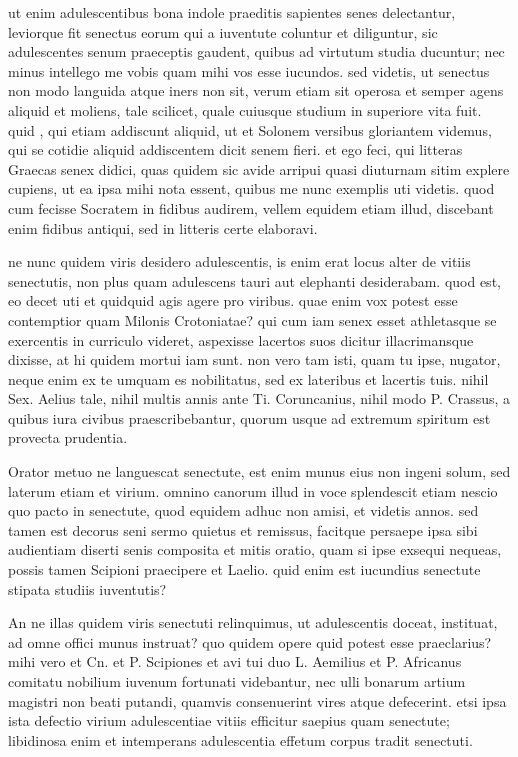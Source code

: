  ut enim adulescentibus bona indole praeditis sapientes senes delectantur, leviorque fit senectus eorum qui a iuventute coluntur et diliguntur, sic adulescentes senum praeceptis gaudent, quibus ad virtutum studia ducuntur; nec minus intellego me vobis quam mihi vos esse iucundos. sed videtis, ut senectus non modo languida atque iners non sit, verum etiam sit operosa et semper agens aliquid et moliens, tale scilicet, quale cuiusque studium in superiore vita fuit. quid , qui etiam addiscunt aliquid, ut et Solonem versibus gloriantem videmus, qui se cotidie aliquid addiscentem dicit senem fieri. et ego feci, qui litteras Graecas senex didici, quas quidem sic avide arripui quasi diuturnam sitim explere cupiens, ut ea ipsa mihi nota essent, quibus me nunc exemplis uti videtis. quod cum fecisse Socratem in fidibus audirem, vellem equidem etiam illud, discebant enim fidibus antiqui, sed in litteris certe elaboravi.

 ne nunc quidem viris desidero adulescentis, is enim erat locus alter de vitiis senectutis, non plus quam adulescens tauri aut elephanti desiderabam. quod est, eo decet uti et quidquid agis agere pro viribus. quae enim vox potest esse contemptior quam Milonis Crotoniatae? qui cum iam senex esset athletasque se exercentis in curriculo videret, aspexisse lacertos suos dicitur illacrimansque dixisse, at hi quidem mortui iam sunt. non vero tam isti, quam tu ipse, nugator, neque enim ex te umquam es nobilitatus, sed ex lateribus et lacertis tuis. nihil Sex. Aelius tale, nihil multis annis ante Ti. Coruncanius, nihil modo P. Crassus, a quibus iura civibus praescribebantur, quorum usque ad extremum spiritum est provecta prudentia.

 Orator metuo ne languescat senectute, est enim munus eius non ingeni solum, sed laterum etiam et virium. omnino canorum illud in voce splendescit etiam nescio quo pacto in senectute, quod equidem adhuc non amisi, et videtis annos. sed tamen est decorus seni sermo quietus et remissus, facitque persaepe ipsa sibi audientiam diserti senis composita et mitis oratio, quam si ipse exsequi nequeas, possis tamen Scipioni praecipere et Laelio. quid enim est iucundius senectute stipata studiis iuventutis?

 An ne illas quidem viris senectuti relinquimus, ut adulescentis doceat, instituat, ad omne offici munus instruat? quo quidem opere quid potest esse praeclarius? mihi vero et Cn. et P. Scipiones et avi tui duo L. Aemilius et P. Africanus comitatu nobilium iuvenum fortunati videbantur, nec ulli bonarum artium magistri non beati putandi, quamvis consenuerint vires atque defecerint. etsi ipsa ista defectio virium adulescentiae vitiis efficitur saepius quam senectute; libidinosa enim et intemperans adulescentia effetum corpus tradit senectuti.

